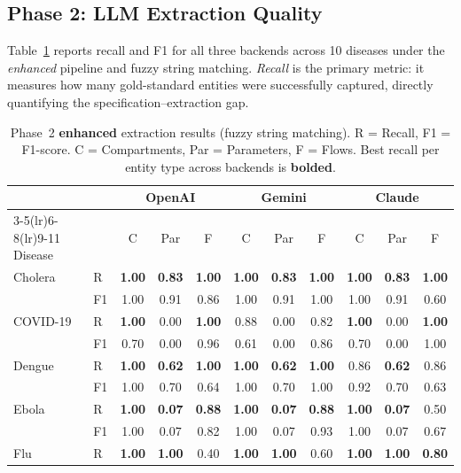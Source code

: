 \subsection{Phase 2: LLM Extraction Quality}
\label{sec:phase2results}

Table~\ref{tab:phase2} reports recall and F1 for all three backends across 10 diseases
under the \emph{enhanced} pipeline and fuzzy string matching.
\emph{Recall} is the primary metric: it measures how many gold-standard entities were
successfully captured, directly quantifying the specification--extraction gap.

\begin{table}[t]
\caption{Phase~2 \textbf{enhanced} extraction results (fuzzy string matching).
R = Recall, F1 = F1-score. C = Compartments, Par = Parameters, F = Flows.
Best recall per entity type across backends is \textbf{bolded}.}
\label{tab:phase2}
\small
\setlength{\tabcolsep}{3.5pt}
\begin{tabular}{llccccccccc}
\toprule
 & & \multicolumn{3}{c}{OpenAI} & \multicolumn{3}{c}{Gemini} & \multicolumn{3}{c}{Claude} \\
\cmidrule(lr){3-5}\cmidrule(lr){6-8}\cmidrule(lr){9-11}
Disease & & C & Par & F & C & Par & F & C & Par & F \\
\midrule
Cholera    & R  & \textbf{1.00} & \textbf{0.83} & \textbf{1.00} & \textbf{1.00} & \textbf{0.83} & \textbf{1.00} & \textbf{1.00} & \textbf{0.83} & \textbf{1.00} \\
           & F1 & 1.00 & 0.91 & 0.86 & 1.00 & 0.91 & 1.00 & 1.00 & 0.91 & 0.60 \\
COVID-19   & R  & \textbf{1.00} & 0.00 & \textbf{1.00} & 0.88 & 0.00 & 0.82 & \textbf{1.00} & 0.00 & \textbf{1.00} \\
           & F1 & 0.70 & 0.00 & 0.96 & 0.61 & 0.00 & 0.86 & 0.70 & 0.00 & 1.00 \\
Dengue     & R  & \textbf{1.00} & \textbf{0.62} & \textbf{1.00} & \textbf{1.00} & \textbf{0.62} & \textbf{1.00} & 0.86 & \textbf{0.62} & 0.86 \\
           & F1 & 1.00 & 0.70 & 0.64 & 1.00 & 0.70 & 1.00 & 0.92 & 0.70 & 0.63 \\
Ebola      & R  & \textbf{1.00} & \textbf{0.07} & \textbf{0.88} & \textbf{1.00} & \textbf{0.07} & \textbf{0.88} & \textbf{1.00} & \textbf{0.07} & 0.50 \\
           & F1 & 1.00 & 0.07 & 0.82 & 1.00 & 0.07 & 0.93 & 1.00 & 0.07 & 0.67 \\
Flu        & R  & \textbf{1.00} & \textbf{1.00} & 0.40 & \textbf{1.00} & \textbf{1.00} & 0.60 & \textbf{1.00} & \textbf{1.00} & \textbf{0.80} \\

\end{tabular}
\end{table}
